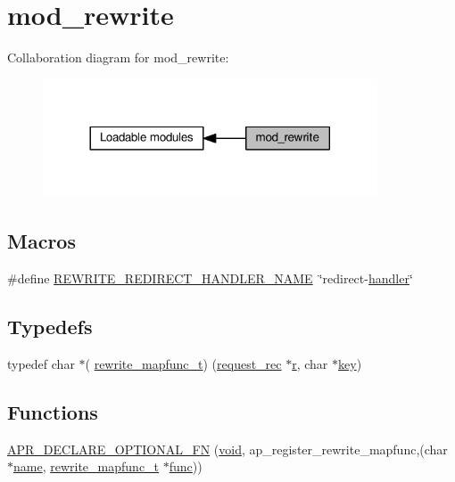 \hypertarget{group__MOD__REWRITE}{}\section{mod\+\_\+rewrite}
\label{group__MOD__REWRITE}
Collaboration diagram for mod\+\_\+rewrite\+:
\nopagebreak
\begin{figure}[H]
\begin{center}
\leavevmode
\includegraphics[width=281pt]{group__MOD__REWRITE}
\end{center}
\end{figure}
\subsection*{Macros}
\begin{DoxyCompactItemize}
\item 
\#define \hyperlink{group__MOD__REWRITE_ga08ac1c3a856e0169b33b5ed0cb68cdff}{R\+E\+W\+R\+I\+T\+E\+\_\+\+R\+E\+D\+I\+R\+E\+C\+T\+\_\+\+H\+A\+N\+D\+L\+E\+R\+\_\+\+N\+A\+ME}~\char`\"{}redirect-\/\hyperlink{writing-handlers_8txt_a06375414bd03dc9c48eab0f361ada458}{handler}\char`\"{}
\end{DoxyCompactItemize}
\subsection*{Typedefs}
\begin{DoxyCompactItemize}
\item 
typedef char $\ast$( \hyperlink{group__MOD__REWRITE_ga2c1dffdb94038f3ded0c3ae84889e1c6}{rewrite\+\_\+mapfunc\+\_\+t}) (\hyperlink{structrequest__rec}{request\+\_\+rec} $\ast$\hyperlink{pcregrep_8txt_a2e9e9438b26c0bb4425367a7e4f75eb3}{r}, char $\ast$\hyperlink{apr__siphash_8h_adac0b6a30345ea1d0daa8a692b0b7ad9}{key})
\end{DoxyCompactItemize}
\subsection*{Functions}
\begin{DoxyCompactItemize}
\item 
\hyperlink{group__MOD__REWRITE_ga3488ce252ee7ca1e3a0721821bf08e63}{A\+P\+R\+\_\+\+D\+E\+C\+L\+A\+R\+E\+\_\+\+O\+P\+T\+I\+O\+N\+A\+L\+\_\+\+FN} (\hyperlink{group__MOD__ISAPI_gacd6cdbf73df3d9eed42fa493d9b621a6}{void}, ap\+\_\+register\+\_\+rewrite\+\_\+mapfunc,(char $\ast$\hyperlink{pcre_8txt_a5a15d68aadb41c771fe50a27c400d49b}{name}, \hyperlink{group__MOD__REWRITE_ga2c1dffdb94038f3ded0c3ae84889e1c6}{rewrite\+\_\+mapfunc\+\_\+t} $\ast$\hyperlink{group__apr__thread__proc_ga40bf04c29bfb67c93dc7dc5075531285}{func}))
\end{DoxyCompactItemize}



